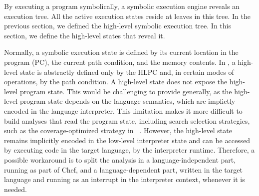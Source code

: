 By executing a program symbolically, a symbolic execution engine reveals an execution tree.  All the active execution states reside at leaves in this tree.
%
In the previous section, we defined the high-level symbolic execution tree.  In this section, we define the high-level states that reveal it.



Normally, a symbolic execution state is defined by its current location in the program (PC), the current path condition, and the memory contents.
%
In \chef, a high-level state is abstractly defined only by the HLPC and, in certain modes of operations, by the path condition.
%
A \chef high-level state does not expose the high-level program state.  This would be challenging to provide generally, as the high-level program state depends on the language semantics, which are implictly encoded in the language interpreter.
%
This limitation makes it more difficult to build analyses that read the program state, including search selection strategies, such as the coverage-optimized strategy in \klee~\cite{klee}.
%
However, the high-level state remains implicitly encoded in the low-level interpreter state and can be accessed by executing code in the target language, by the interpreter runtime.  Therefore, a possible workaround is to split the analysis in a language-independent part, running as part of Chef, and a language-dependent part, written in the target language and running as an interrupt in the interpreter context, whenever it is needed.




